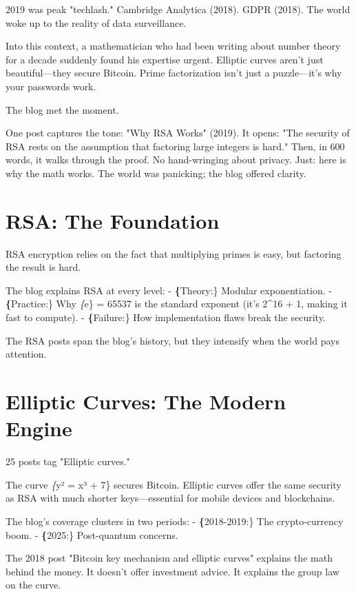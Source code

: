 2019 was peak "techlash." Cambridge Analytica (2018). GDPR (2018). The world woke up to the reality of data surveillance.

Into this context, a mathematician who had been writing about number theory for a decade suddenly found his expertise urgent. Elliptic curves aren't just beautiful—they secure Bitcoin. Prime factorization isn't just a puzzle—it's why your passwords work.

The blog met the moment.

One post captures the tone: "Why RSA Works" (2019). It opens: "The security of RSA rests on the assumption that factoring large integers is hard." Then, in 600 words, it walks through the proof. No hand-wringing about privacy. Just: here is why the math works. The world was panicking; the blog offered clarity.

\bigskip

\section*{RSA: The Foundation}

RSA encryption relies on the fact that multiplying primes is easy, but factoring the result is hard.

The blog explains RSA at every level:
- \textbf\{Theory:\} Modular exponentiation.
- \textbf\{Practice:\} Why \textit\{e\} = 65537 is the standard exponent (it's 2\textasciicircum{}16 + 1, making it fast to compute).
- \textbf\{Failure:\} How implementation flaws break the security.

The RSA posts span the blog's history, but they intensify when the world pays attention.

\bigskip

\section*{Elliptic Curves: The Modern Engine}

25 posts tag "Elliptic curves."

The curve \textit\{y² = x³ + 7\} secures Bitcoin. Elliptic curves offer the same security as RSA with much shorter keys—essential for mobile devices and blockchains.

The blog's coverage clusters in two periods:
- \textbf\{2018-2019:\} The crypto-currency boom.
- \textbf\{2025:\} Post-quantum concerns.

The 2018 post "Bitcoin key mechanism and elliptic curves" explains the math behind the money. It doesn't offer investment advice. It explains the group law on the curve.

